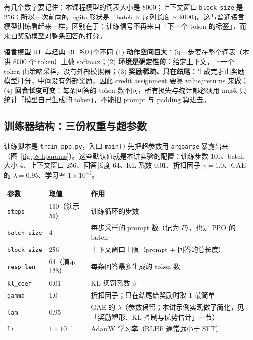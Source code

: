 有几个数字要记住：本课程模型的词表大小是 8000；上下文窗口 \texttt{block\_size} 是 256；所以一次前向的 logits 形状是「batch × 序列长度 × 8000」。这与普通语言模型训练看起来一样，区别在于：训练信号不再来自「下一个 token 的标签」，而来自奖励模型对整条回答的打分。

\begin{knowledgebox}{语言模型 RL 与经典 RL 的四个不同}
(1) \textbf{动作空间巨大}：每一步要在整个词表（本讲 8000 个 token）上做 softmax；(2) \textbf{环境是确定性的}：给定上下文，下一个 token 由策略采样，没有外部模拟器；(3) \textbf{奖励稀疏、只在结尾}：生成完才由奖励模型打分，中间没有外部奖励，因此 credit assignment 要靠 value/returns 来做；(4) \textbf{回合长度可变}：每条回答的 token 数不同，所有损失与统计都必须用 mask 只统计「模型自己生成的 token」，不能把 prompt 与 padding 算进去。
\end{knowledgebox}

\subsection{训练器结构：三份权重与超参数}

训练脚本是 \texttt{train\_ppo.py}，入口 \texttt{main()} 先把超参数用 \texttt{argparse} 暴露出来（图~\ref{fig:p8-hparams}）。这些默认值就是本讲实验的配置：训练步数 100、batch 大小 4、上下文窗口 256、回答长度 64、KL 系数 0.01、折扣因子 $\gamma=1.0$、GAE 的 $\lambda=0.95$、学习率 $1\times10^{-5}$。

\begin{center}
\begin{tabular}{p{3.4cm}p{2.6cm}p{8.0cm}}
\toprule
参数 & 取值 & 作用 \\
\midrule
\texttt{steps} & 100（演示 50） & 训练循环的步数 \\
\texttt{batch\_size} & 4 & 每步采样的 prompt 数（记为 $P$），也是 PPO 的 batch \\
\texttt{block\_size} & 256 & 上下文窗口上限（prompt + 回答的总长度） \\
\texttt{resp\_len} & 64（演示 128） & 每条回答最多生成的 token 数 \\
\texttt{kl\_coef} & 0.01 & KL 惩罚系数 $\beta$ \\
\texttt{gamma} & 1.0 & 折扣因子；只在结尾给奖励时取 1 最简单 \\
\texttt{lam} & 0.95 & GAE 的 $\lambda$（参数保留；本讲示例实现做了简化，见「奖励塑形、KL 控制与优势估计」一节） \\
\texttt{lr} & $1\times10^{-5}$ & AdamW 学习率（RLHF 通常远小于 SFT） \\
\bottomrule
\end{tabular}
\end{center}

